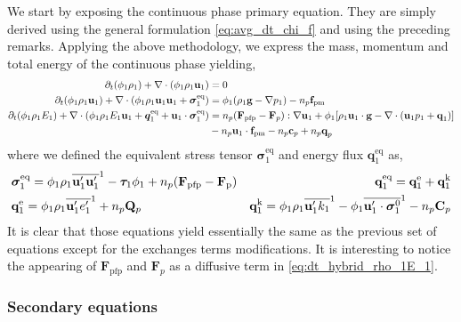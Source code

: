 We start by exposing the continuous phase primary equation. 
They are simply derived using the general formulation \ref{eq:avg_dt_chi_f} and using the preceding remarks. 
Applying the above methodology, we express the mass, momentum and total energy of the continuous phase yielding, 
\begin{align}
    \label{eq:dt_hybrid_rho_1}
    \partial_t (\phi_1 \rho_1)  
    + \mathbf{\nabla}\cdot (
        \phi_1 \rho_1\textbf{u}_1
    )
    &= 
    0\\
    \label{eq:dt_hybrid_rho_1u_1}
    \partial_t (\phi_1 \rho_1\textbf{u}_1)  
    + \mathbf{\nabla}\cdot (
        \phi_1 \rho_1\textbf{u}_1\textbf{u}_1
        + \bm{\sigma}_1^\text{eq}
    )
    &= 
    \phi_1 (\rho_1 \textbf{g} 
    - \mathbf{\nabla} p_1 ) 
    -  n_p \textbf{f}_\text{pm}\\
    \label{eq:dt_hybrid_rho_1E_1}
    \partial_t (\phi_1\rho_1E_1)  
    + \mathbf{\nabla}\cdot (
        \phi_1\rho_1E_1\textbf{u}_1
        + \bm{q}_1^\text{eq}
        + \textbf{u}_1 \cdot \bm{\sigma}_1^\text{eq}
        )
    &= 
    n_p (\textbf{F}_\text{pfp}- \textbf{F}_p) :\mathbf{\nabla} \textbf{u}_1
    +\phi_1 [\rho_1\textbf{u}_1 \cdot \textbf{g} 
    - \mathbf{\nabla}\cdot(\textbf{u}_1p_1 + \textbf{q}_1)]\nonumber\\
    &- n_p \textbf{u}_1 \cdot \textbf{f}_\text{pm}
    - n_p \textbf{c}_p
    + n_p \textbf{q}_p
\end{align} 
where we defined the equivalent stress tensor $\bm{\sigma}_1^\text{eq}$ and energy flux $\textbf{q}^\text{eq}_1$ as,
\begin{align*}
    &\bm{\sigma}_1^\text{eq}
    = \phi_1\rho_1\overline{\textbf{u}_1'\textbf{u}_1'}^1
    - \bm{\tau}_1 \phi_1
    + n_p (\textbf{F}_\text{pfp} - \textbf{F}_\text{p})
    &\textbf{q}_1^\text{eq}
    =\textbf{q}_1^\text{e} +\textbf{q}_1^\text{k} \\
    &\textbf{q}_1^\text{e}
    = \phi_1\rho_1 \overline{\textbf{u}_1' e_1'}^1 + n_p \mathbf{Q}_p
    &\textbf{q}_1^\text{k}
    = \phi_1\rho_1 \overline{\textbf{u}_1' k_1}^1 
    - \phi_1\overline{\textbf{u}_1' \cdot \bm{\sigma}_1^0}^1
    - n_p \textbf{C}_p 
\end{align*}
It is clear that those equations yield essentially the same as the previous set of equations except for the exchanges terms modifications.
It is interesting to notice the appearing of $\textbf{F}_\text{pfp}$ and $\textbf{F}_p$ as a diffusive term in  \ref{eq:dt_hybrid_rho_1E_1}.

\subsubsection{Secondary equations}


